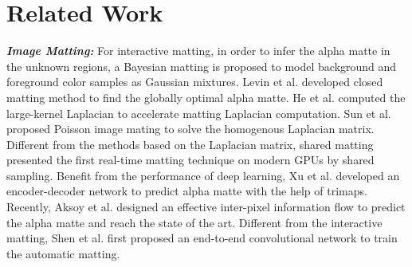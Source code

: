 \documentclass[sigconf]{acmart}
\begin{document}
\section{Related Work}\textbf{\emph{Image Matting:}} For interactive matting, in order to infer the alpha matte in the unknown regions, a Bayesian matting \cite{chuang2001bayesian} is proposed to model background and foreground color samples as Gaussian mixtures. Levin et al. \cite{levin2008closed} developed closed matting method to find the globally optimal alpha matte. He et al. \cite{he2010fast} computed the large-kernel Laplacian to accelerate matting Laplacian computation. Sun et al. \cite{sun2004poisson} proposed Poisson image mating to solve the homogenous Laplacian matrix. Different from the methods based on the Laplacian matrix, shared matting \cite{gastal2010shared} presented the first real-time matting technique on modern GPUs by shared sampling. Benefit from the performance of deep learning, Xu et al. \cite{xu2017deep} developed an encoder-decoder network to predict alpha matte with the help of trimaps. Recently, Aksoy et al. \cite{aksoy2017designing} designed an effective inter-pixel information flow to predict the alpha matte and reach the state of the art. Different from the interactive matting, Shen et al. \cite{shen2016deep} first proposed an end-to-end convolutional network to train the automatic matting.
\end{document}
